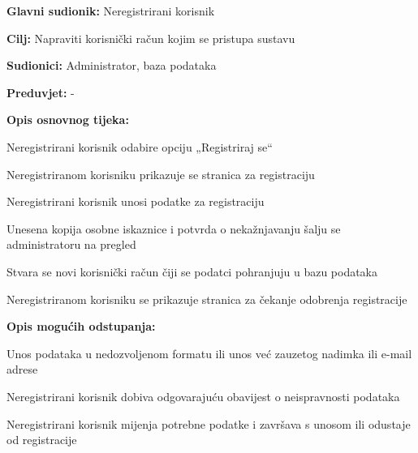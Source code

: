 						\noindent {}
						\begin{packed_item}
							
							\item \textbf{Glavni sudionik: } Neregistrirani korisnik
							\item  \textbf{Cilj:} Napraviti korisnički račun kojim se pristupa sustavu
							\item  \textbf{Sudionici:} Administrator, baza podataka
							\item  \textbf{Preduvjet:} -
							\item  \textbf{Opis osnovnog tijeka:}
							
							\item[] \begin{packed_enum}
								
								\item	Neregistrirani korisnik odabire opciju „Registriraj se“
								\item 	Neregistriranom korisniku prikazuje se stranica za registraciju
							    \item 	Neregistrirani korisnik unosi podatke za registraciju
								\item 	Unesena kopija osobne iskaznice i potvrda o nekažnjavanju šalju se administratoru na pregled
								\item 	Stvara se novi korisnički račun čiji se podatci pohranjuju u bazu podataka
								\item 	Neregistriranom korisniku se prikazuje stranica za čekanje odobrenja registracije
								
								 
								
							\end{packed_enum}
							
							\item  \textbf{Opis mogućih odstupanja:}
							
							\item[] \begin{packed_item}
								
								\item[3.a] Unos podataka u nedozvoljenom formatu ili unos već zauzetog nadimka ili e-mail adrese
								\item[] \begin{packed_enum}
									
									\item 	Neregistrirani korisnik dobiva odgovarajuću obavijest o neispravnosti podataka
									\item	Neregistrirani korisnik mijenja potrebne podatke i završava s unosom ili odustaje od registracije
									
									
								\end{packed_enum}
								
								
							\end{packed_item}
						\end{packed_item}
